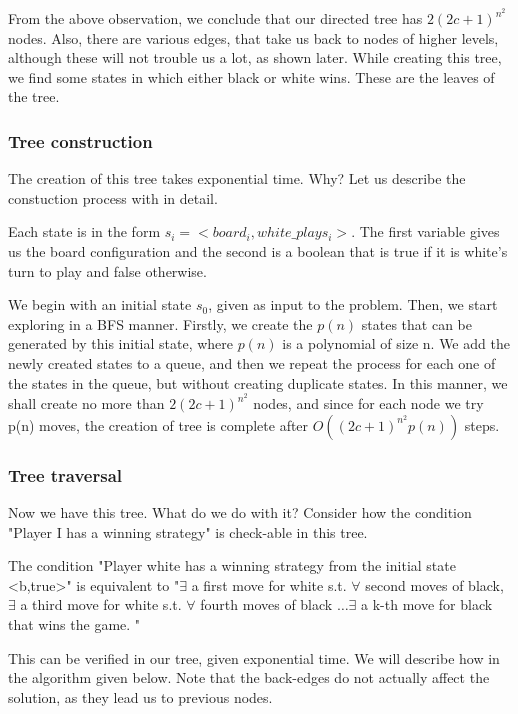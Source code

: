 From the above observation, we conclude that our directed tree has $2(2c+1)^{n^2}$ nodes. Also, there are various edges,
that take us back to nodes of higher levels, although these will not trouble us a lot, as shown later. While 
creating this tree, we find some states in which either black or white 
wins. These are the leaves of the tree. 

\subsubsection*{Tree construction}
The creation of this tree takes exponential time. Why? Let us describe the 
constuction process with in detail.

Each state is in the form $s_i= <board_i, white\_plays_i>$. The first variable gives us the board configuration and 
the second is a boolean that is true if it is white's turn to play and false otherwise. 

We begin with an initial state $s_0$, given as input to the problem. Then, we start exploring in a BFS manner. Firstly, we 
create the $p(n)$ states that can be generated by this initial state, where $p(n)$ is a polynomial of size n. We add the newly
created states to a queue, and then we repeat the process for each one of the states in the queue, but without creating 
duplicate states. In this manner, we shall create no more than $2(2c+1)^{n^2}$ nodes, and since for each node we 
try p(n) moves, the creation of tree is complete after $O((2c+1)^{n^2}p(n))$ steps.

\subsubsection*{Tree traversal}
Now we have this tree. What do we do with it? Consider how the condition
"Player I has a winning strategy" is check-able in this tree.  

The condition "Player white has a winning strategy from the initial state 
<b,true>" is equivalent to "$\exists$ a first move for white s.t. $\forall$ second moves 
of black, $\exists$ a third move for white s.t. $\forall$ fourth moves of black
$\ldots \exists$ a k-th move for black that wins the game. "

This can be verified in our tree, given exponential time. We will describe how in the algorithm given below.
Note that the back-edges do not actually affect the solution, as they lead us to previous nodes.
\newline

